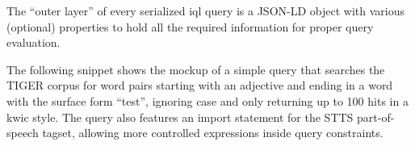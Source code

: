 \documentclass[11pt,a4paper]{report}
\begin{document}
The ``outer layer'' of every serialized \ac{iql} query is a JSON-LD object with various (optional) properties to hold all the required information for proper query evaluation.

The following snippet shows the mockup of a simple query that searches the TIGER corpus for word pairs starting with an adjective and ending in a word with the surface form ``test'', ignoring case and only returning up to 100 hits in a \ac{kwic} style. 
The query also features an import statement for the STTS part-of-speech tagset, allowing more controlled expressions inside query constraints.
\medskip




\end{document}
